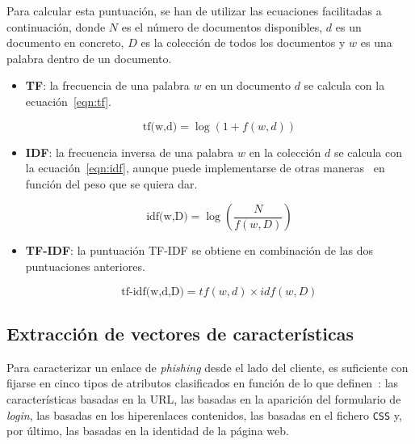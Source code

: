 Para calcular esta puntuación, se han de utilizar las ecuaciones facilitadas a continuación, donde $N$ es el número de documentos disponibles, $d$ es un documento en concreto, $D$ es la colección de todos los documentos y $w$ es una palabra dentro de un documento.

\begin{itemize}
	\item \textbf{TF}: la frecuencia de una palabra $w$ en un documento $d$ se calcula con la ecuación~\ref{eqn:tf}.
	
	\begin{equation}\label{eqn:tf} \textrm{tf(w,d)} = \log{(1 + f(w,d))} \end{equation}
	
	\item \textbf{IDF}: la frecuencia inversa de una palabra $w$ en la colección $d$ se calcula con la ecuación~\ref{eqn:idf}, aunque puede implementarse de otras maneras~\cite{tfidfsklearn2020} en función del peso que se quiera dar.
	
	\begin{equation}\label{eqn:idf} \textrm{idf(w,D)} = \log{(\frac{N}{f(w,D)})} \end{equation}
	
	\item \textbf{TF-IDF}: la puntuación TF-IDF se obtiene en combinación de las dos puntuaciones anteriores.
	
	\begin{equation}\label{eqn:tfidf} \textrm{tf-idf(w,d,D)} = tf(w,d) \times idf(w,D) \end{equation}
	
\end{itemize}

\subsection{Extracción de vectores de características}
\label{sec:vectores_caracteristicas_phishing}

Para caracterizar un enlace de \textit{phishing} desde el lado del cliente, es suficiente con fijarse en cinco tipos de atributos clasificados en función de lo que definen~\cite{featuresPhishing2018Gupta}: las características basadas en la URL, las basadas en la aparición del formulario de \textit{login}, las  basadas en los hiperenlaces contenidos, las basadas en el fichero \texttt{CSS} y, por último, las basadas en la identidad de la página web.

